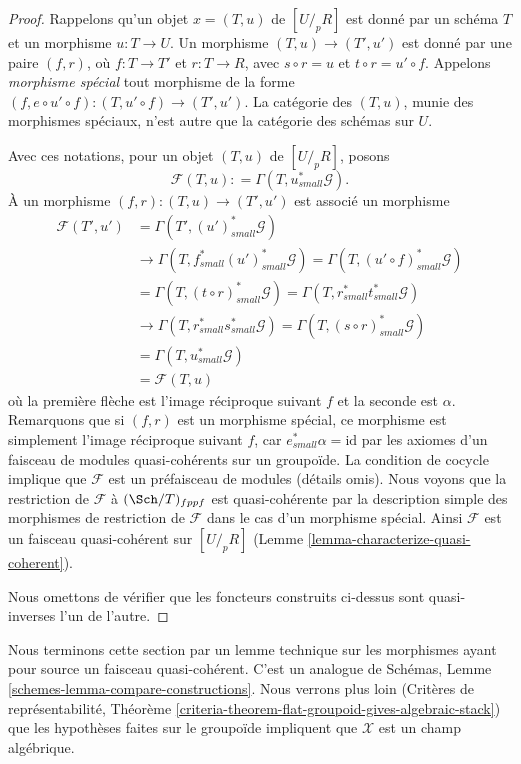 \begin{proof}
\medskip\noindent
Rappelons qu'un objet $x = (T, u)$ de $[U/_{\!p}R]$
est donné par un schéma $T$ et un morphisme $u : T \to U$. Un morphisme
$(T, u) \to (T', u')$ est donné par une paire $(f, r)$, où $f : T \to T'$
et $r : T \to R$, avec $s \circ r = u$ et $t \circ r = u' \circ f$.
Appelons {\it morphisme spécial} tout morphisme de la forme
$(f, e \circ u' \circ f) : (T, u' \circ f) \to (T', u')$.
La catégorie des $(T, u)$, munie des morphismes spéciaux, n'est autre que la
catégorie des schémas sur $U$.

\medskip\noindent
Avec ces notations, pour un objet $(T, u)$ de $[U/_{\!p}R]$, posons
$$
\mathcal{F}(T, u) : = \Gamma(T, u_{small}^*\mathcal{G}).
$$
À un morphisme $(f, r) : (T, u) \to (T', u')$ est associé un morphisme
\begin{align*}
\mathcal{F}(T', u') & = \Gamma(T', (u')_{small}^*\mathcal{G}) \\
& \to \Gamma(T, f_{small}^*(u')_{small}^*\mathcal{G}) =
\Gamma(T, (u' \circ f)_{small}^*\mathcal{G}) \\
& = \Gamma(T, (t \circ r)_{small}^*\mathcal{G}) =
\Gamma(T, r_{small}^*t_{small}^*\mathcal{G}) \\
& \to \Gamma(T, r_{small}^*s_{small}^*\mathcal{G}) =
\Gamma(T, (s \circ r)_{small}^*\mathcal{G}) \\
& = \Gamma(T, u_{small}^*\mathcal{G}) \\
& = \mathcal{F}(T, u)
\end{align*}
où la première flèche est l'image réciproque suivant $f$ et la seconde est
$\alpha$. Remarquons que si $(f, r)$ est un morphisme spécial, ce
morphisme est simplement l'image réciproque suivant $f$, car $e_{small}^*\alpha = \text{id}$ par
les axiomes d'un faisceau de modules quasi-cohérents sur un groupoïde.
La condition de cocycle implique que $\mathcal{F}$ est un préfaisceau
de modules (détails omis). Nous voyons que la restriction de $\mathcal{F}$
à $(\Sch/T)_{fppf}$ est quasi-cohérente par la description simple des
morphismes de restriction de $\mathcal{F}$ dans le cas d'un morphisme spécial.
Ainsi $\mathcal{F}$ est un faisceau quasi-cohérent sur $[U/_{\!p}R]$
(Lemme \ref{lemma-characterize-quasi-coherent}).

\medskip\noindent
Nous omettons de vérifier que les foncteurs construits ci-dessus sont
quasi-inverses l'un de l'autre.
\end{proof}

\noindent
Nous terminons cette section par un lemme technique sur les morphismes ayant pour source un faisceau
quasi-cohérent. C'est un analogue de
Schémas, Lemme \ref{schemes-lemma-compare-constructions}.
Nous verrons plus loin (Critères de représentabilité, Théorème
\ref{criteria-theorem-flat-groupoid-gives-algebraic-stack})
que les hypothèses faites sur le groupoïde impliquent que $\mathcal{X}$ est
un champ algébrique.


